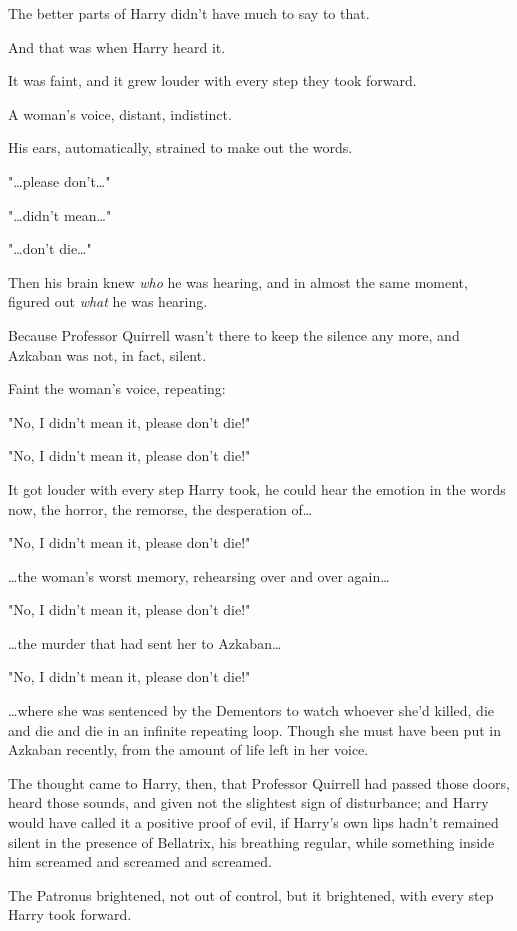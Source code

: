 The better parts of Harry didn't have much to say to that.

And that was when Harry heard it.

It was faint, and it grew louder with every step they took forward.

A woman's voice, distant, indistinct.

His ears, automatically, strained to make out the words.

"{\ldots}please don't{\ldots}"

"{\ldots}didn't mean{\ldots}"

"{\ldots}don't die{\ldots}"

Then his brain knew \emph{who} he was hearing, and in almost the same moment, 
figured out \emph{what} he was hearing.

Because Professor Quirrell wasn't there to keep the silence any more, and 
Azkaban was not, in fact, silent.

Faint the woman's voice, repeating:

"No, I didn't mean it, please don't die!"

"No, I didn't mean it, please don't die!"

It got louder with every step Harry took, he could hear the emotion in the 
words now, the horror, the remorse, the desperation of{\ldots}

"No, I didn't mean it, please don't die!"

{\ldots}the woman's worst memory, rehearsing over and over again{\ldots}

"No, I didn't mean it, please don't die!"

{\ldots}the murder that had sent her to Azkaban{\ldots}

"No, I didn't mean it, please don't die!"

{\ldots}where she was sentenced by the Dementors to watch whoever she'd killed, 
die and die and die in an infinite repeating loop. Though she must have been 
put in Azkaban recently, from the amount of life left in her voice.

The thought came to Harry, then, that Professor Quirrell had passed those 
doors, heard those sounds, and given not the slightest sign of disturbance; and 
Harry would have called it a positive proof of evil, if Harry's own lips hadn't 
remained silent in the presence of Bellatrix, his breathing regular, while 
something inside him screamed and screamed and screamed.

The Patronus brightened, not out of control, but it brightened, with every step 
Harry took forward.

